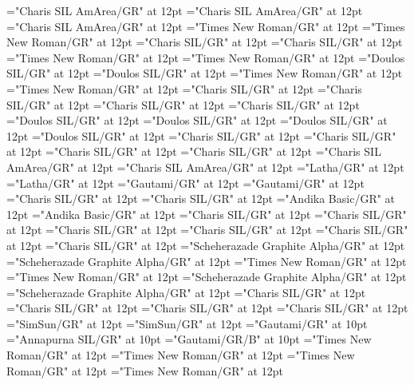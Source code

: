 \documentclass[a4paper]{article}
\begin{document}
\font\spanmxbfonipa="Charis SIL AmArea/GR" at 12pt
\font\divmxb="Charis SIL AmArea/GR" at 12pt
\font\spanmxb="Charis SIL AmArea/GR" at 12pt
\font\divmy="Times New Roman/GR" at 12pt
\font\spanmy="Times New Roman/GR" at 12pt
\font\divne="Charis SIL/GR" at 12pt
\font\spanne="Charis SIL/GR" at 12pt
\font\divpt="Times New Roman/GR" at 12pt
\font\spanpt="Times New Roman/GR" at 12pt
\font\divqaafonipaxyii="Doulos SIL/GR" at 12pt
\font\spanqaafonipaxyii="Doulos SIL/GR" at 12pt
\font\divqaaxlel="Times New Roman/GR" at 12pt
\font\spanqaaxlel="Times New Roman/GR" at 12pt
\font\divro="Charis SIL/GR" at 12pt
\font\spanro="Charis SIL/GR" at 12pt
\font\divru="Charis SIL/GR" at 12pt
\font\spanru="Charis SIL/GR" at 12pt
\font\divsehfonipaxetic="Doulos SIL/GR" at 12pt
\font\spansehfonipaxetic="Doulos SIL/GR" at 12pt
\font\divsehfonipa="Doulos SIL/GR" at 12pt
\font\spansehfonipa="Doulos SIL/GR" at 12pt
\font\divsehZxxxxaudio="Charis SIL/GR" at 12pt
\font\spansehZxxxxaudio="Charis SIL/GR" at 12pt
\font\divseh="Charis SIL/GR" at 12pt
\font\spanseh="Charis SIL/GR" at 12pt
\font\divstp="Charis SIL AmArea/GR" at 12pt
\font\spanstp="Charis SIL AmArea/GR" at 12pt
\font\divta="Latha/GR" at 12pt
\font\spanta="Latha/GR" at 12pt
\font\divte="Gautami/GR" at 12pt
\font\spante="Gautami/GR" at 12pt
\font\divth="Charis SIL/GR" at 12pt
\font\spanth="Charis SIL/GR" at 12pt
\font\divtpi="Andika Basic/GR" at 12pt
\font\spantpi="Andika Basic/GR" at 12pt
\font\divtrfonipaxemic="Charis SIL/GR" at 12pt
\font\spantrfonipaxemic="Charis SIL/GR" at 12pt
\font\divtrfonipa="Charis SIL/GR" at 12pt
\font\spantrfonipa="Charis SIL/GR" at 12pt
\font\divtr="Charis SIL/GR" at 12pt
\font\spantr="Charis SIL/GR" at 12pt
\font\divurArab="Scheherazade Graphite Alpha/GR" at 12pt
\font\spanurArab="Scheherazade Graphite Alpha/GR" at 12pt
\font\divurxind="Times New Roman/GR" at 12pt
\font\spanurxind="Times New Roman/GR" at 12pt
\font\divur="Scheherazade Graphite Alpha/GR" at 12pt
\font\spanur="Scheherazade Graphite Alpha/GR" at 12pt
\font\divvi="Charis SIL/GR" at 12pt
\font\spanvi="Charis SIL/GR" at 12pt
\font\divzhCNpinyin="Charis SIL/GR" at 12pt
\font\spanzhCNpinyin="Charis SIL/GR" at 12pt
\font\divzhCN="SimSun/GR" at 12pt
\font\spanzhCN="SimSun/GR" at 12pt
\font\xitemte="Gautami/GR" at 10pt
\font\xitemhi="Annapurna SIL/GR" at 10pt
\font\xitemxitemcomplexformformbefore="Gautami/GR/B" at 10pt
\font\xitemxitemcomplexformrefsbefore="Times New Roman/GR" at 12pt
\font\xitemxitemdefinitionbefore="Times New Roman/GR" at 12pt
\font\xitemxitementryrefcomponentbefore="Times New Roman/GR" at 12pt
\font\xitemxitementryreftypebefore="Times New Roman/GR" at 12pt
\end{document}
